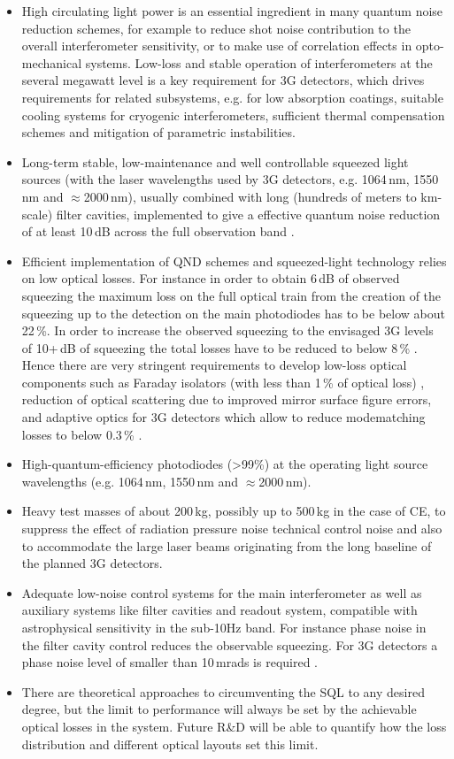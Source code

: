 \begin{itemize}
\item High circulating light power is an essential ingredient in many quantum noise reduction schemes, for example to reduce shot noise contribution to the overall interferometer sensitivity, or to make use of correlation effects in opto-mechanical systems. Low-loss and stable operation of interferometers at the several megawatt level   is a key requirement for 3G detectors,  which drives requirements for related subsystems, e.g.  for low absorption coatings, suitable cooling systems for cryogenic interferometers, sufficient thermal compensation schemes and mitigation of parametric instabilities.  
\item  Long-term  stable,  low-maintenance  and well controllable squeezed light sources (with the laser wavelengths used by 3G detectors, e.g. 1064\,nm, 1550\,nm and $\approx$2000\,nm), usually combined with long (hundreds  of meters to km-scale) filter cavities, implemented to give a effective  quantum noise reduction of  at least  10\,dB  across the full observation band .
\item Efficient implementation of QND schemes and squeezed-light technology relies on  low optical losses. For instance in order to obtain 6\,dB of observed squeezing the maximum loss on the full optical train from the creation of the squeezing up to the detection on the main photodiodes has to be below about 22\,\%. In order to increase the observed squeezing to the envisaged 3G levels of 10+\,dB of squeezing the total losses have to be reduced to below 8\,\% \cite{LSC_IS_WP}. Hence there are very stringent requirements to develop  low-loss optical components such as Faraday isolators (with less than 1\,\% of optical loss) , reduction of optical scattering due to improved mirror surface figure errors, and adaptive optics for 3G detectors  which allow to reduce modematching losses to below 0.3\,\% . 
\item High-quantum-efficiency photodiodes (>99\%) at the operating light source wavelengths (e.g. 1064\,nm, 1550\,nm and $\approx$2000\,nm).
\item Heavy test masses of about 200\,kg,  possibly up to 500\,kg in the case of CE,  to suppress the effect of radiation pressure noise technical control noise and also to accommodate the large laser beams originating from the long baseline of the planned 3G detectors.
\item Adequate low-noise control systems for the main interferometer as well as auxiliary systems like filter cavities and readout system, compatible with astrophysical sensitivity in the sub-10Hz band.
For instance phase noise in the filter cavity control reduces the observable squeezing. For 3G detectors a phase noise level of smaller than 10\,mrads is required \cite{LSC_IS_WP}.
\item There are theoretical approaches to circumventing the SQL to any desired degree, but the limit to performance will always be set by the achievable optical losses in the system. Future R\&D will be able to quantify how the loss distribution and different optical layouts set this limit.
\end{itemize}

